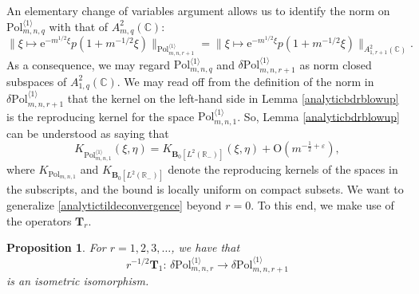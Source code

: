 \documentclass{birkart}
\newtheorem{prop}[thm]{Proposition}
\theoremstyle{definition}
\theoremstyle{remark}
\numberwithin{equation}{section}
\numberwithin{figure}{section}
\newcommand{\e}{\mathrm e}
\newcommand{\1}{{\mathbf 1}}
\newcommand{\C}{{\mathbb C}}
\newcommand{\R}{{\mathbb R}}
\newcommand{\Ordo}{\mathrm{O}}
\newcommand{\Tope}{{\mathbf T}}
\newcommand{\Bop}{{\mathbf B}}
\newcommand{\Fspace}{{\delta\mathrm{Pol}}}
\begin{document}
An elementary change of variables argument allows us to identify the norm on
$\mathrm{Pol}^{\langle1\rangle}_{m,n,q}$ with that of $A^2_{m,q}(\C)$:
\begin{equation} 
\label{normidentity}
\big\|\xi\mapsto \e^{-{m}^{1/2}\xi}p(1+m^{-1/2}\xi)
\big\|_{\mathrm{Pol}^{\langle1\rangle}_{m,n,r+1}}=
\big\|\xi\mapsto \e^{-{m}^{1/2}\xi}p(1+m^{-1/2}\xi)
\big\|_{A^2_{1,r+1}(\C)}.
\end{equation}
As a consequence, we may regard $\mathrm{Pol}^{\langle1\rangle}_{m,n,q}$ 
and ${\Fspace}^{\langle1\rangle}_{m,n,r+1}$ as norm closed subspaces of 
$A^2_{1,q}(\C)$. We may read off from the definition 
of the norm in ${\Fspace}^{\langle1\rangle}_{m,n,r+1}$ that the kernel on the 
left-hand side in Lemma \ref{analyticbdrblowup} is the reproducing kernel for 
the space $\mathrm{Pol}^{\langle1\rangle}_{m,n,1}$. So, 
Lemma \ref{analyticbdrblowup} can be understood as saying that
\begin{equation} 
\label{analytictildeconvergence}
K_{\mathrm{Pol}^{\langle1\rangle}_{m,n,1}}(\xi,\eta)= 
K_{\Bop_0[L^2(\R_-)]}(\xi,\eta)+\Ordo(m^{-\frac12+\varepsilon}), 
\end{equation}
where $K_{\mathrm{Pol}_{m,n,1}}$ and $K_{\Bop_0[L^2(\R_-)]}$ denote the 
reproducing kernels of the spaces in the subscripts, and the bound is locally 
uniform on compact subsets. We want to generalize 
\eqref{analytictildeconvergence} beyond $r=0$. To this end, we make use of
the operators $\Tope_{r}$.

\begin{prop}
\label{lem-T1}
For $r=1,2,3,\ldots$, we have that
\[
r^{-1/2}\Tope_{1}:\,{\Fspace}^{\langle1\rangle}_{m,n,r}\to
{\Fspace}^{\langle1\rangle}_{m,n,r+1}
\]
is an isometric isomorphism.
\end{prop}
\end{document}
